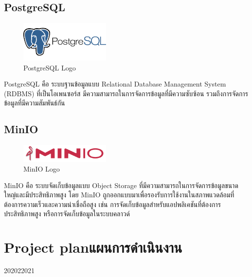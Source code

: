 \subsection{PostgreSQL}
    \begin{figure}[ht]
        \centering
        \includegraphics[width=0.4\textwidth, keepaspectratio]{image/Tools/postgresql-logo.png}
        \caption[PostgreSQL Logo]{PostgreSQL Logo\footnotemark}
        \label{fig:postgresql_logo}
    \end{figure}
    \FloatBarrier
\qquad PostgreSQL คือ ระบบฐานข้อมูลแบบ Relational Database Management System (RDBMS) ที่เป็นโอเพนซอร์ส มีความสามารถในการจัดการข้อมูลที่มีความซับซ้อน รวมถึงการจัดการข้อมูลที่มีความสัมพันธ์กัน

\subsection{MinIO}
    \begin{figure}[ht]
        \centering
        \includegraphics[width=0.4\textwidth, keepaspectratio]{image/Tools/minio-logo.png}
        \caption[MinIO Logo]{MinIO Logo\footnotemark}
        \label{fig:minio_logo}
    \end{figure}
    \FloatBarrier
\qquad MinIO คือ ระบบจัดเก็บข้อมูลแบบ Object Storage ที่มีความสามารถในการจัดการข้อมูลขนาดใหญ่และมีประสิทธิภาพสูง โดย MinIO ถูกออกแบบมาเพื่อรองรับการใช้งานในสภาพแวดล้อมที่ต้องการความเร็วและความน่าเชื่อถือสูง เช่น การจัดเก็บข้อมูลสำหรับแอปพลิเคชันที่ต้องการประสิทธิภาพสูง หรือการจัดเก็บข้อมูลในระบบคลาวด์

\section{\ifenglish Project plan\else แผนการดำเนินงาน\fi}

\begin{plan}{6}{2020}{2}{2021}
\end{plan}

